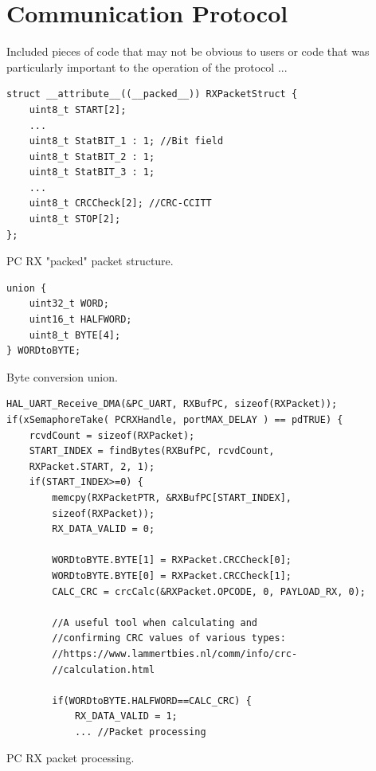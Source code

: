 \chapter{Communication Protocol}

Included pieces of code that may not be obvious to users or code that was particularly important to the operation of the protocol ...


\begin{listing}[ht]
\begin{verbatim}
struct __attribute__((__packed__)) RXPacketStruct {
	uint8_t START[2];
	...
	uint8_t StatBIT_1 : 1; //Bit field
	uint8_t StatBIT_2 : 1;
	uint8_t StatBIT_3 : 1;
	...
	uint8_t CRCCheck[2]; //CRC-CCITT        
	uint8_t STOP[2];
};
\end{verbatim}
\caption{PC RX "packed" packet structure.}
\label{listing:packet-packet}
\end{listing}

\begin{listing}[ht]
\begin{verbatim}
union {
	uint32_t WORD;
	uint16_t HALFWORD;
	uint8_t BYTE[4];
} WORDtoBYTE;
\end{verbatim}
\caption{Byte conversion union.}
\label{listing:Byte conversion union}
\end{listing}

\begin{listing}[ht]
\begin{verbatim}
HAL_UART_Receive_DMA(&PC_UART, RXBufPC, sizeof(RXPacket));
if(xSemaphoreTake( PCRXHandle, portMAX_DELAY ) == pdTRUE) {
	rcvdCount = sizeof(RXPacket);
	START_INDEX = findBytes(RXBufPC, rcvdCount, 
	RXPacket.START, 2, 1);
	if(START_INDEX>=0) {
		memcpy(RXPacketPTR, &RXBufPC[START_INDEX], 		
		sizeof(RXPacket));
		RX_DATA_VALID = 0;

		WORDtoBYTE.BYTE[1] = RXPacket.CRCCheck[0];
		WORDtoBYTE.BYTE[0] = RXPacket.CRCCheck[1];
		CALC_CRC = crcCalc(&RXPacket.OPCODE, 0, PAYLOAD_RX, 0);
		
		//A useful tool when calculating and 
		//confirming CRC values of various types: 
		//https://www.lammertbies.nl/comm/info/crc-		
		//calculation.html

		if(WORDtoBYTE.HALFWORD==CALC_CRC) {
			RX_DATA_VALID = 1;
			... //Packet processing
\end{verbatim}
\caption{PC RX packet processing.}
\label{listing:PC RX packet processing}
\end{listing}

